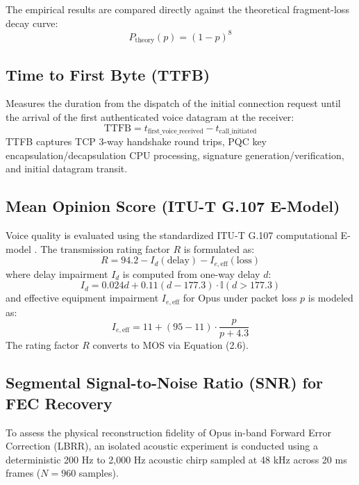The empirical results are compared directly against the theoretical fragment-loss decay curve:
\begin{equation}
    P_{\text{theory}}(p) = (1 - p)^8
\end{equation}

\subsection{Time to First Byte (TTFB)}
Measures the duration from the dispatch of the initial connection request until the arrival of the first authenticated voice datagram at the receiver:
\begin{equation}
    \text{TTFB} = t_{\text{first\_voice\_received}} - t_{\text{call\_initiated}}
\end{equation}
TTFB captures TCP 3-way handshake round trips, PQC key encapsulation/decapsulation CPU processing, signature generation/verification, and initial datagram transit.

\subsection{Mean Opinion Score (ITU-T G.107 E-Model)}
Voice quality is evaluated using the standardized ITU-T G.107 computational E-model \cite{itut_g107}. The transmission rating factor $R$ is formulated as:
\begin{equation}
    R = 94.2 - I_d(\text{delay}) - I_{e,\text{eff}}(\text{loss})
\end{equation}
where delay impairment $I_d$ is computed from one-way delay $d$:
\begin{equation}
    I_d = 0.024 d + 0.11 (d - 177.3) \cdot \mathbb{I}(d > 177.3)
\end{equation}
and effective equipment impairment $I_{e,\text{eff}}$ for Opus under packet loss $p$ is modeled as:
\begin{equation}
    I_{e,\text{eff}} = 11 + (95 - 11) \cdot \frac{p}{p + 4.3}
\end{equation}
The rating factor $R$ converts to MOS via Equation (2.6).

\subsection{Segmental Signal-to-Noise Ratio (SNR) for FEC Recovery}
To assess the physical reconstruction fidelity of Opus in-band Forward Error Correction (LBRR), an isolated acoustic experiment is conducted using a deterministic 200 Hz to 2,000 Hz acoustic chirp sampled at 48 kHz across 20 ms frames ($N = 960$ samples).


